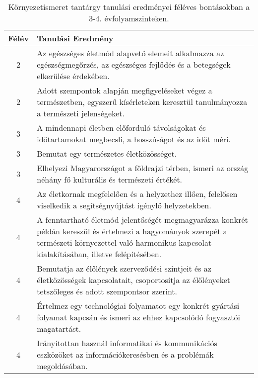        
           \begin{longtable}{c | p{} }
            \caption[Környezetismeret 3-4.]{Környezetismeret tantárgy tanulási eredményei féléves bontásokban a 3-4. évfolyamszinteken. }  \\

            \textbf{Félév} & \textbf{Tanulási Eredmény} \\
            \hline
            \endhead
                                
                                          2 &  Az egészséges életmód alapvető elemeit alkalmazza az egészségmegőrzés, az egészséges fejlődés és a betegségek elkerülése érdekében. \\ \hline
                                          2 &  Adott szempontok alapján megfigyeléseket végez a természetben, egyszerű kísérleteken keresztül tanulmányozza a természeti jelenségeket. \\ \hline
                                      
                                
                                          3 &  A mindennapi életben előforduló távolságokat és időtartamokat megbecsli, a hosszúságot és az időt méri. \\ \hline
                                          3 &  Bemutat egy természetes életközösséget. \\ \hline
                                          3 &  Elhelyezi Magyarországot a földrajzi térben, ismeri az ország néhány fő kulturális és természeti értékét. \\ \hline
                                      
                                
                                          4 &  Az életkornak megfelelően és a helyzethez illően, felelősen viselkedik a segítségnyújtást igénylő helyzetekben. \\ \hline
                                          4 &  A fenntartható életmód jelentőségét megmagyarázza konkrét példán kereszül és értelmezi a hagyományok szerepét a természeti környezettel való harmonikus kapcsolat kialakításában, illetve felépítésében. \\ \hline
                                          4 &  Bemutatja az élőlények szerveződési szintjeit és az életközösségek kapcsolatait, csoportosítja az élőlényeket tetszőleges és adott szempontsor szerint. \\ \hline
                                          4 &  Értelmez egy technológiai folyamatot egy konkrét gyártási folyamat kapcsán és ismeri az ehhez kapcsolódó fogyasztói magatartást. \\ \hline
                                          4 &  Irányítottan használ informatikai és kommunikációs eszközöket az információkeresésben és a problémák megoldásában. \\ \hline
                                      
                        \end{longtable}
            \clearpage

